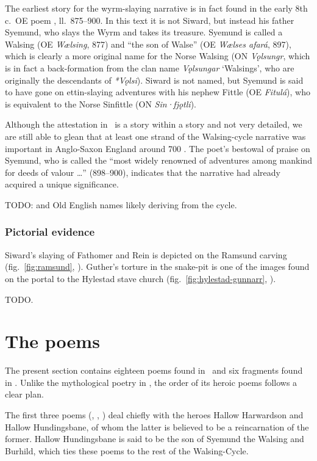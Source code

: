 The earliest story for the wyrm-slaying narrative is in fact found in the early 8th c.~OE poem \Beowulf, ll.~875--900.  In this text it is not Siward, but instead his father Syemund, who slays the Wyrm and takes its treasure.  Syemund is called a Walsing (OE \emph{Wælsing}, 877) and “the son of Walse” (OE \emph{Wælses afará}, 897), which is clearly a more original name for the Norse Walsing (ON \emph{Vǫlsungr}, which is in fact a back-formation from the clan name \emph{Vǫlsungar} ‘Walsings’, who are originally the descendants of \emph{*Vǫlsi}).  Siward is not named, but Syemund is said to have gone on ettin-slaying adventures with his nephew Fittle (OE \emph{Fitulá}), who is equivalent to the Norse Sinfittle (ON \emph{Sin·fjǫtli}).

Although the attestation in \Beowulf\ is a story within a story and not very detailed, we are still able to glean that at least one strand of the Walsing-cycle narrative was important in Anglo-Saxon England around 700 \ce.  The poet’s bestowal of praise on Syemund, who is called the “most widely renowned of adventures among mankind for deeds of valour \dots” (898--900), indicates that the narrative had already acquired a unique significance.

TODO: \textcite{Neidorf2013} and Old English names likely deriving from the cycle.

\subsubsection{Pictorial evidence}

Siward’s slaying of Fathomer and Rein is depicted on the Ramsund carving (fig.~\ref{fig:ramsund}, \pageref{fig:ramsund}).  Guther’s torture in the snake-pit is one of the images found on the portal to the Hylestad stave church (fig.~\ref{fig:hylestad-gunnarr}, \pageref{fig:hylestad-gunnarr}).

TODO.

\section{The poems}

The present section contains eighteen poems found in \Regius\ and six fragments found in \VolsungaMS.  Unlike the mythological poetry in \Regius, the order of its heroic poems follows a clear plan.

The first three poems (, , ) deal chiefly with the heroes Hallow Harwardson and Hallow Hundingsbane, of whom the latter is believed to be a reincarnation of the former.  Hallow Hundingsbane is said to be the son of Syemund the Walsing and Burhild, which ties these poems to the rest of the Walsing-Cycle.

